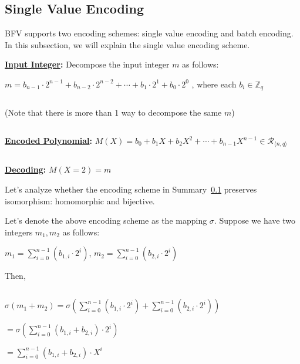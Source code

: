 \clearpage

\subsection{Single Value Encoding}
\label{subsec:bfv-single-encoding}

BFV supports two encoding schemes: single value encoding and batch encoding. In this subsection, we will explain the single value encoding scheme. 



\begin{tcolorbox}[title={\textbf{\tboxlabel{\ref*{subsec:bfv-single-encoding}} BFV Encoding}}]

\textbf{\underline{Input Integer}:} Decompose the input integer $m$ as follows:

$m = b_{n-1}\cdot 2^{n-1} + b_{n-2}\cdot 2^{n-2} + \cdots + b_1\cdot 2^1 + b_0\cdot 2^0$  \text { } , where each $b_i \in \mathbb{Z}_q$

$ $

(Note that there is more than 1 way to decompose the same $m$)

$ $

\textbf{\underline{Encoded Polynomial}:} $M(X) = b_0 + b_1X + b_2X^2 + \cdots + b_{n-1}X^{n-1} \in \mathcal{R}_{\langle n, q\rangle}$

$ $

\textbf{\underline{Decoding}:} $M(X=2) = m$

\end{tcolorbox}


Let's analyze whether the encoding scheme in Summary~\ref*{subsec:bfv-single-encoding} preserves isomorphism: homomorphic and bijective. 


 Let's denote the above encoding scheme as the mapping $\sigma$. Suppose we have two integers $m_1, m_2$ as follows:

$m_1 = \sum\limits_{i=0}^{n-1}(b_{1, i} \cdot 2^i)$, \text{ } $m_2 = \sum\limits_{i=0}^{n-1}(b_{2, i} \cdot 2^i)$

Then,

$ $

$\sigma (m_1 + m_2) = \sigma\left(\sum\limits_{i=0}^{n-1}(b_{1, i} \cdot 2^i) + \sum\limits_{i=0}^{n-1}(b_{2,i} \cdot 2^i)\right)$

$= \sigma\left(\sum\limits_{i=0}^{n-1}(b_{1,i} + b_{2,i})\cdot 2^i\right)$

$= \sum\limits_{i=0}^{n-1} (b_{1,i} + b_{2,i})\cdot X^i$

